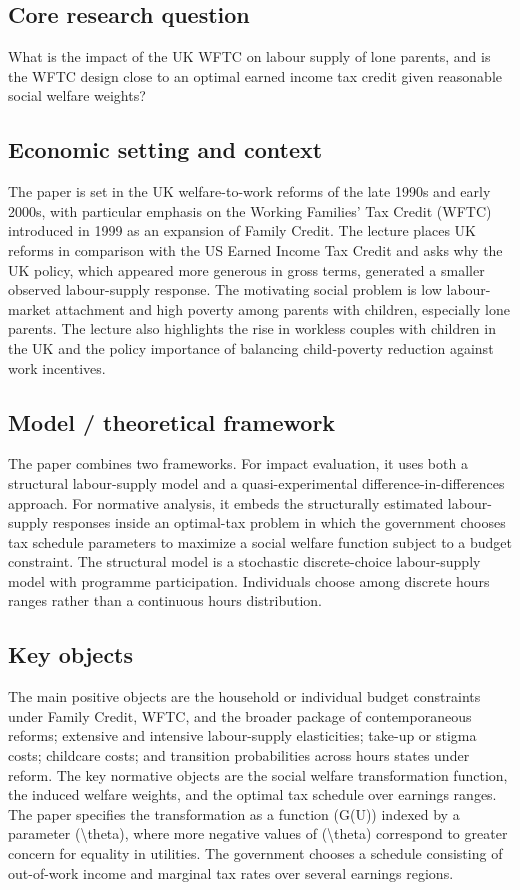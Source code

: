\documentclass[11pt,a4paper]{article}
\begin{document}
\subsection*{Core research question}
What is the impact of the UK WFTC on labour supply of lone parents, and is the WFTC design close to an optimal earned income tax credit given reasonable social welfare weights?

\subsection*{Economic setting and context}
The paper is set in the UK welfare-to-work reforms of the late 1990s and early 2000s, with particular emphasis on the Working Families’ Tax Credit (WFTC) introduced in 1999 as an expansion of Family Credit. The lecture places UK reforms in comparison with the US Earned Income Tax Credit and asks why the UK policy, which appeared more generous in gross terms, generated a smaller observed labour-supply response. The motivating social problem is low labour-market attachment and high poverty among parents with children, especially lone parents. The lecture also highlights the rise in workless couples with children in the UK and the policy importance of balancing child-poverty reduction against work incentives.

\subsection*{Model / theoretical framework}
The paper combines two frameworks. For impact evaluation, it uses both a structural labour-supply model and a quasi-experimental difference-in-differences approach. For normative analysis, it embeds the structurally estimated labour-supply responses inside an optimal-tax problem in which the government chooses tax schedule parameters to maximize a social welfare function subject to a budget constraint. The structural model is a stochastic discrete-choice labour-supply model with programme participation. Individuals choose among discrete hours ranges rather than a continuous hours distribution.

\subsection*{Key objects}
The main positive objects are the household or individual budget constraints under Family Credit, WFTC, and the broader package of contemporaneous reforms; extensive and intensive labour-supply elasticities; take-up or stigma costs; childcare costs; and transition probabilities across hours states under reform. The key normative objects are the social welfare transformation function, the induced welfare weights, and the optimal tax schedule over earnings ranges. The paper specifies the transformation as a function (G(U)) indexed by a parameter (\textbackslash{}theta), where more negative values of (\textbackslash{}theta) correspond to greater concern for equality in utilities. The government chooses a schedule consisting of out-of-work income and marginal tax rates over several earnings regions.
\end{document}
